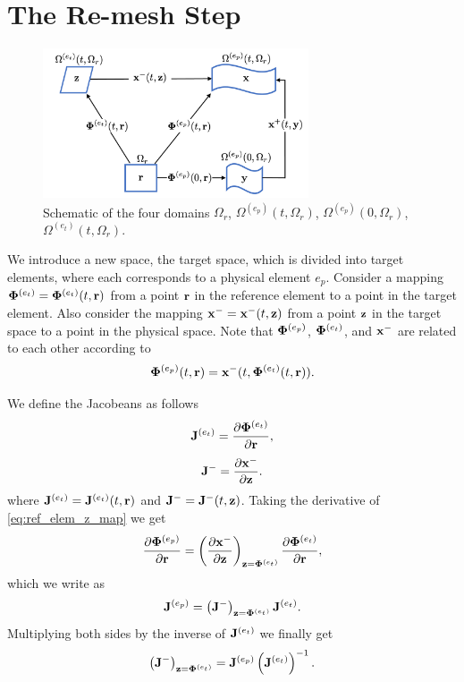 \documentclass[11pt]{report}
\begin{document}
\chapter{The Re-mesh Step}
\begin{figure}[ht]
    \centering
    \includegraphics[width=0.7\textwidth]{../../images/four_spaces.pdf}
    \caption{Schematic of the four domains $\Omega_r$, $\Omega^{(e_p)}(t,\Omega_r)$, $\Omega^{(e_p)}(0,\Omega_r)$, $\Omega^{(e_t)}(t,\Omega_r)$.}
    \label{fig:four_spaces}
 \end{figure}
We introduce a new space, the target space, which is divided into target elements, where each corresponds to a physical element $e_p$. Consider a mapping $\bm \Phi^{(e_t)}=\bm \Phi^{(e_t)}(t,\mathbf{r})$ from a point $\mathbf{r}$ in the reference element to a point in the target element. Also consider the mapping $\mathbf{x}^- = \mathbf{x}^-(t,\mathbf{z})$ from a point $\mathbf{z}$ in the target space to a point in the physical space. Note that $\bm \Phi^{(e_p)}$, $\bm \Phi^{(e_t)}$, and $\mathbf{x}^-$ are related to each other according to
\begin{equation}
    \label{eq:ref_elem_z_map}
    \bm \Phi^{(e_p)}(t,\mathbf{r}) = \mathbf{x}^-(t,\bm \Phi^{(e_t)}(t,\mathbf{r})).
\end{equation}

We define the Jacobeans as follows
\begin{equation}
    \mathbf{J}^{(e_t)} = \frac{\partial \bm \Phi^{(e_t)}}{\partial \mathbf{r}},
\end{equation}
\begin{equation}
    \mathbf{J}^- = \frac{\partial \mathbf{x}^-}{\partial \mathbf{z}}.
\end{equation}
where $\mathbf{J}^{(e_t)} = \mathbf{J}^{(e_t)}(t,\mathbf{r})$ and $\mathbf{J}^-=\mathbf{J}^-(t,\mathbf{z})$. Taking the derivative of \cref{eq:ref_elem_z_map} we get
\begin{equation*}
    \frac{\partial \bm \Phi^{(e_p)}}{\partial \mathbf{r}} = \left( \frac{ \partial \mathbf{x}^-}{\partial \mathbf{z}} \right)_{\mathbf{z}=\bm \Phi^{(e_t)}} \frac{ \partial \bm \Phi^{(e_t)} }{ \partial \mathbf{r}},
\end{equation*}
which we write as
\begin{equation*}
    \mathbf{J}^{(e_p)} = \left( \mathbf{J}^- \right)_{\mathbf{z}=\bm \Phi^{(e_t)}} \mathbf{J}^{(e_t)}.
\end{equation*}
Multiplying both sides by the inverse of $\mathbf{J}^{(e_t)}$ we finally get
\begin{equation}
    \left( \mathbf{J}^- \right)_{\mathbf{z}=\bm \Phi^{(e_t)}} = \mathbf{J}^{(e_p)} \left( \mathbf{J}^{(e_t)} \right)^{-1}.
\end{equation}
\end{document}
